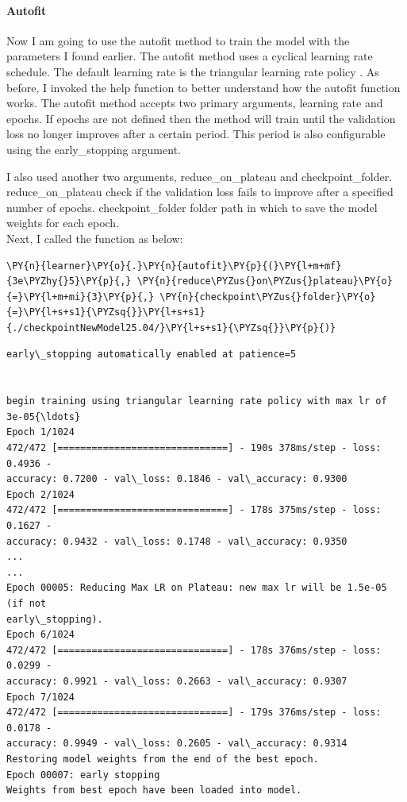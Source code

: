 \paragraph{Autofit}
Now I am going to use the autofit \cite{noauthor_amaiyaktrainautofit_nodate} method to train the model with the parameters I found earlier.
The autofit method uses a cyclical learning rate schedule. The default learning rate is the triangular learning rate policy \cite{smith_cyclical_2017}.
As before, I invoked the help function to better understand how the autofit function works.
The autofit method accepts two primary arguments, learning rate and epochs.
If epochs are not defined then the method will train until the validation loss no longer improves after a certain period. This period is also configurable using the early\_stopping argument. 

I also used another two arguments, reduce\_on\_plateau and checkpoint\_folder.\\
reduce\_on\_plateau check if the validation loss fails to improve after a specified number of epochs.
checkpoint\_folder folder path in which to save the model weights for each epoch.\\
Next, I called the function as below:
    \begin{tcolorbox}[breakable, size=fbox, boxrule=1pt, pad at break*=1mm,colback=cellbackground, colframe=cellborder]
\begin{Verbatim}[commandchars=\\\{\},fontsize=\footnotesize]
\PY{n}{learner}\PY{o}{.}\PY{n}{autofit}\PY{p}{(}\PY{l+m+mf}{3e\PYZhy{}5}\PY{p}{,} \PY{n}{reduce\PYZus{}on\PYZus{}plateau}\PY{o}{=}\PY{l+m+mi}{3}\PY{p}{,} \PY{n}{checkpoint\PYZus{}folder}\PY{o}{=}\PY{l+s+s1}{\PYZsq{}}\PY{l+s+s1}{./checkpointNewModel25.04/}\PY{l+s+s1}{\PYZsq{}}\PY{p}{)}
\end{Verbatim}
\end{tcolorbox}


  \begin{Verbatim}[commandchars=\\\{\},fontsize=\footnotesize]
early\_stopping automatically enabled at patience=5


begin training using triangular learning rate policy with max lr of 3e-05{\ldots}
Epoch 1/1024
472/472 [==============================] - 190s 378ms/step - loss: 0.4936 -
accuracy: 0.7200 - val\_loss: 0.1846 - val\_accuracy: 0.9300
Epoch 2/1024
472/472 [==============================] - 178s 375ms/step - loss: 0.1627 -
accuracy: 0.9432 - val\_loss: 0.1748 - val\_accuracy: 0.9350
...
...
Epoch 00005: Reducing Max LR on Plateau: new max lr will be 1.5e-05 (if not
early\_stopping).
Epoch 6/1024
472/472 [==============================] - 178s 376ms/step - loss: 0.0299 -
accuracy: 0.9921 - val\_loss: 0.2663 - val\_accuracy: 0.9307
Epoch 7/1024
472/472 [==============================] - 179s 376ms/step - loss: 0.0178 -
accuracy: 0.9949 - val\_loss: 0.2605 - val\_accuracy: 0.9314
Restoring model weights from the end of the best epoch.
Epoch 00007: early stopping
Weights from best epoch have been loaded into model.
    \end{Verbatim}
    
